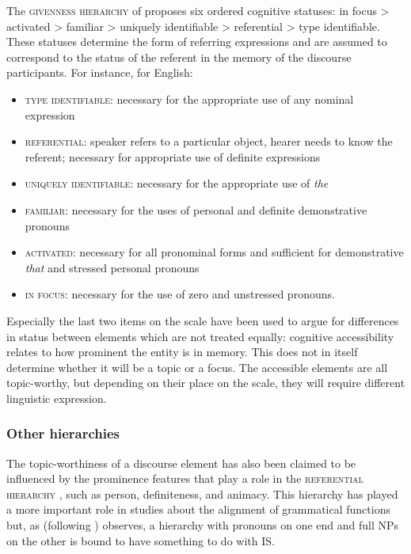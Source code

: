 \documentclass[output=paper,hidelinks]{langscibook}
\begin{document}
 The \textsc{givenness hierarchy} of \citet{GHZ93} proposes six ordered cognitive statuses: in focus > activated > familiar > uniquely identifiable > referential > type identifiable. These statuses determine the form of referring expressions and are assumed to correspond to the status of the referent in the memory of the discourse participants. For instance, for English: 

\begin{itemize} \label{GH}
\setlength\itemsep{-1pt}
    \item \textsc{type identifiable}: necessary for the appropriate use of any nominal expression
    \item \textsc{referential}: speaker refers to a particular object, hearer needs to know the referent; necessary for appropriate use of definite expressions
    \item \textsc{uniquely identifiable}: necessary for the appropriate use of \textit{the}
    \item \textsc{familiar}: necessary for the uses of personal and definite demonstrative pronouns
    \item \textsc{activated}: necessary for all pronominal forms and sufficient for demonstrative \emph{that} and stressed personal pronouns
    \item \textsc{in focus}: necessary for the use of zero and unstressed pronouns.
\end{itemize}

Especially the last two items on the scale have been used to argue for differences in status between elements which are not treated equally: cognitive accessibility relates to how prominent the entity is in memory. This does not in itself determine whether it will be a topic or a focus. The accessible elements are all topic-worthy, but depending on their place on the scale, they will require different linguistic expression. 

\subsubsection{Other hierarchies}

The topic-worthiness of a discourse element has also been claimed to be influenced by the prominence features that play a role in the \textsc{referential hierarchy} \citep{Silverstein,Dixon1984}, such as person, definiteness, and animacy. This hierarchy has played a more important role in studies about the alignment of grammatical functions but, as \citet{Simpson2012} (following \citealt{Bickel}) observes, a hierarchy with pronouns on one end and full NPs on the other is bound to have something to do with IS. 
\end{document}
